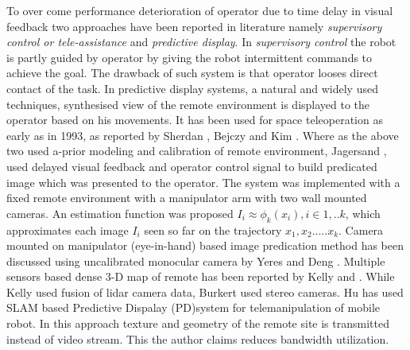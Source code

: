     To over come performance deterioration of operator due to time delay in visual feedback two approaches have been reported in literature namely \textit{supervisory control or tele-assistance  } and \textit{predictive display}. In \textit{supervisory control} \cite{sheridan1986human,pook1994teleassistance,jagersand1995visual} the robot is partly guided by operator by giving the robot intermittent commands to achieve the goal. The drawback of such system is that operator looses direct contact of the task.
    In  predictive display systems, a natural and widely used techniques, synthesised view of the remote environment is displayed to the operator based on his movements. It has been used for space teleoperation as early as in 1993, as reported by Sherdan \cite{sheridan1993space}, Bejczy \cite{bejczy1990predictive} and Kim \cite{kim1993demonstration}. Where as the above two used a-prior modeling and  calibration of remote environment, Jagersand \cite{jagersand1999image}, used delayed visual feedback and operator control signal to build predicated image which was presented to the operator. The system was implemented with a fixed remote environment with a manipulator arm with  two wall mounted cameras. An estimation function was proposed 
    $I_i \approx \phi_k(x_i), i \in {1,..k}$, which approximates each image  $I_i$ seen so far on the trajectory ${x_1, x_2 .....x_k}$. Camera mounted on manipulator (eye-in-hand) based image predication method has been discussed using uncalibrated monocular camera by Yeres \cite{yerex2003predictive} and Deng \cite{deng2003predictive}. Multiple sensors based dense 3-D  map of remote  has been reported by Kelly \cite{kelly2011real} and \cite{burkert2004photorealistic}. While Kelly used fusion of  lidar camera data,  Burkert used stereo cameras. Hu \cite{hu2015line} has used SLAM based Predictive Dispalay  (PD)system for telemanipulation of mobile robot. In this approach texture and geometry of the remote site is transmitted instead of  video stream. This the author claims reduces bandwidth utilization.

